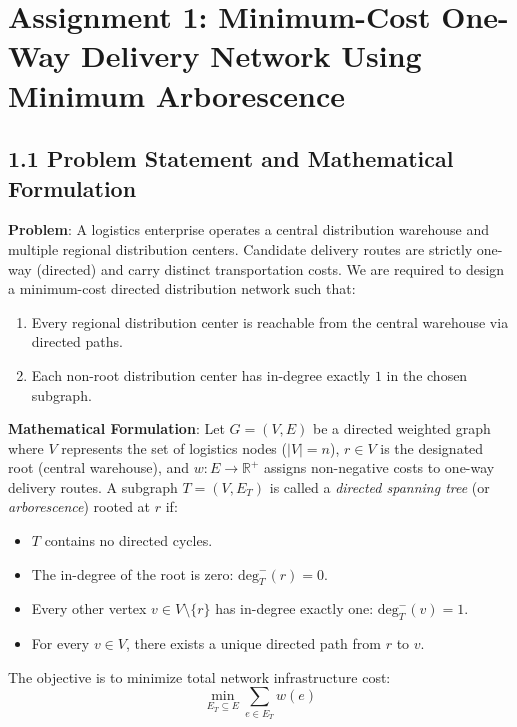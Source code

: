 \documentclass[12pt]{article}
\begin{document}
\section*{Assignment 1: Minimum-Cost One-Way Delivery Network Using Minimum Arborescence}

\subsection*{1.1 Problem Statement and Mathematical Formulation}
\textbf{Problem}: A logistics enterprise operates a central distribution warehouse and multiple regional distribution centers. Candidate delivery routes are strictly one-way (directed) and carry distinct transportation costs. We are required to design a minimum-cost directed distribution network such that:
\begin{enumerate}
    \item Every regional distribution center is reachable from the central warehouse via directed paths.
    \item Each non-root distribution center has in-degree exactly $1$ in the chosen subgraph.
\end{enumerate}

\textbf{Mathematical Formulation}:
Let $G = (V, E)$ be a directed weighted graph where $V$ represents the set of logistics nodes ($|V| = n$), $r \in V$ is the designated root (central warehouse), and $w: E \to \mathbb{R}^+$ assigns non-negative costs to one-way delivery routes. A subgraph $T = (V, E_T)$ is called a \textit{directed spanning tree} (or \textit{arborescence}) rooted at $r$ if:
\begin{itemize}
    \item $T$ contains no directed cycles.
    \item The in-degree of the root is zero: $\text{deg}^-_T(r) = 0$.
    \item Every other vertex $v \in V \setminus \{r\}$ has in-degree exactly one: $\text{deg}^-_T(v) = 1$.
    \item For every $v \in V$, there exists a unique directed path from $r$ to $v$.
\end{itemize}
The objective is to minimize total network infrastructure cost:
\[
\min_{E_T \subseteq E} \sum_{e \in E_T} w(e)
\]
\end{document}
